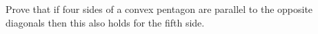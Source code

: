 Prove that if four sides of a convex pentagon are parallel to the opposite diagonals then this also holds for the fifth side.
